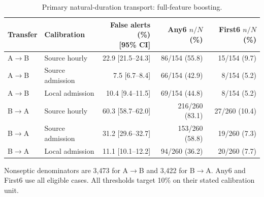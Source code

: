 \begin{table}[tbp]
\centering
\footnotesize
\setlength{\tabcolsep}{4pt}
\renewcommand{\arraystretch}{1.18}
\caption{Primary natural-duration transport: full-feature boosting.}\label{tab:transport}
\begin{tabular}{llrrr}
\toprule
Transfer & Calibration & \makecell{False alerts (\%)\\{}[95\% CI]} & \makecell{Any6\\{}$n/N$ (\%)} & \makecell{First6\\{}$n/N$ (\%)} \\
\midrule
A$\to$B & Source hourly & 22.9 [21.5--24.3] & 86/154 (55.8) & 15/154 (9.7) \\
A$\to$B & Source admission & 7.5 [6.7--8.4] & 66/154 (42.9) & 8/154 (5.2) \\
A$\to$B & Local admission & 10.4 [9.4--11.5] & 69/154 (44.8) & 8/154 (5.2) \\
B$\to$A & Source hourly & 60.3 [58.7--62.0] & 216/260 (83.1) & 27/260 (10.4) \\
B$\to$A & Source admission & 31.2 [29.6--32.7] & 153/260 (58.8) & 19/260 (7.3) \\
B$\to$A & Local admission & 11.1 [10.1--12.2] & 94/260 (36.2) & 20/260 (7.7) \\
\bottomrule
\end{tabular}
\par\vspace{3pt}\begin{minipage}{\linewidth}\footnotesize Nonseptic denominators are 3,473 for A$\to$B and 3,422 for B$\to$A. Any6 and First6 use all eligible cases. All thresholds target 10\% on their stated calibration unit.\end{minipage}
\end{table}
